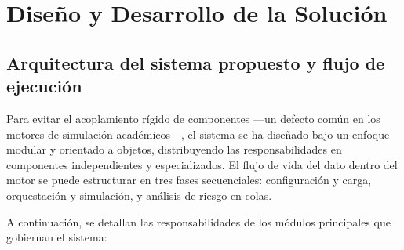 \documentclass[11pt]{article}
\begin{document}
\section{Diseño y Desarrollo de la Solución}

\subsection{Arquitectura del sistema propuesto y flujo de ejecución}

Para evitar el acoplamiento rígido de componentes —un defecto común en los motores de simulación académicos—, el sistema se ha diseñado bajo un enfoque modular y orientado a objetos, distribuyendo las responsabilidades en componentes independientes y especializados. El flujo de vida del dato dentro del motor se puede estructurar en tres fases secuenciales: configuración y carga, orquestación y simulación, y análisis de riesgo en colas.

A continuación, se detallan las responsabilidades de los módulos principales que gobiernan el sistema:
\end{document}
